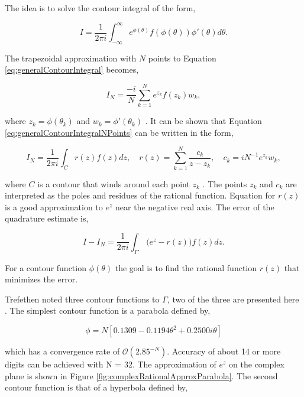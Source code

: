 The idea is to solve the contour integral of the form,

\begin{equation}
    I = \frac{1}{2\pi i}\int_{-\infty}^{\infty}e^{\phi(\theta)}f(\phi(\theta))\phi'(\theta)d\theta.
    \label{eq:generalContourIntegral}
\end{equation}

\noindent The trapezoidal approximation with $N$ points to Equation \ref{eq:generalContourIntegral} becomes,

\begin{equation}
    I_{N} = \frac{-i}{N}\sum_{k=1}^{N}e^{z_{k}}f(z_{k})w_{k},
    \label{eq:generalContourIntegralNPoints}
\end{equation}

\noindent where $z_{k} = \phi(\theta_{k})$ and  $w_{k} = \phi'(\theta_{k})$ \cite{Trefethen2006}. It can be shown that Equation \ref{eq:generalContourIntegralNPoints} can be written in the form,

\begin{equation}
    I_{N} = \frac{1}{2\pi i}\int_{C}r(z)f(z)dz, \quad r(z) = \sum_{k=1}^{N}\frac{c_{k}}{z-z_{k}}, \quad c_{k} = iN^{-1}e^{z_{k}}w_{k},
\end{equation}

\noindent where $C$ is a contour that winds around each point $z_{k}$ \cite{Trefethen2006}. The points $z_{k}$ and $c_{k}$ are interpreted as the poles and residues of the rational function. Equation for $r(z)$ is a good approximation to $e^{z}$ near the negative real axis. The error of the quadrature estimate is,

\begin{equation}
    I - I_{N} = \frac{1}{2\pi i}\int_{\Gamma'} \big(e^{z} - r(z)\big)f(z)dz.
\end{equation}{}

\noindent For a contour function $\phi(\theta)$ the goal is to find the rational function $r(z)$ that minimizes the error. 

Trefethen noted three contour functions to $\Gamma$, two of the three are presented here \cite{Trefethen2006}. The simplest contour function is a parabola defined by, 

\begin{equation}
    \phi = N[0.1309 - 0.1194\theta^{2} + 0.2500i\theta]
    \label{eq:parabolicContour}
\end{equation}

\noindent which has a convergence rate of $\mathcal{O}(2.85^{-N} )$. Accuracy of about 14 or more digits can be achieved with N = 32. The approximation of $e^{z}$ on the complex plane is shown in Figure \ref{fig:complexRationalApproxParabola}. The second contour function is that of a hyperbola defined by, 

